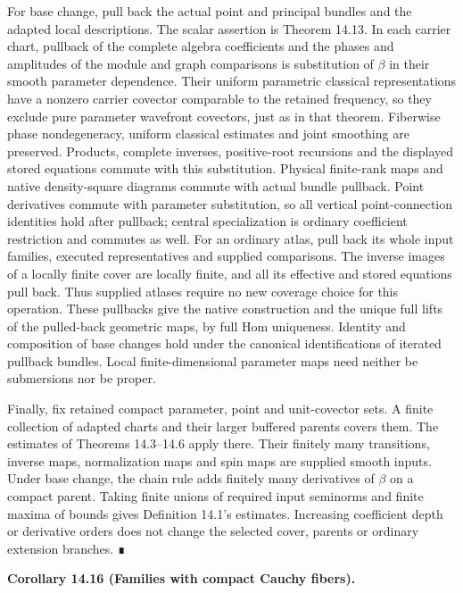 \documentclass[
  english,
  11pt,
  reqno]{amsart}
\makeatletter
\newcommand{\pandocstatementheading}[1]{%
  \par\if@nobreak\else
    \addpenalty{\@beginparpenalty}%
    \addvspace{.5\baselineskip plus .2\baselineskip minus .2\baselineskip}%
  \fi
  {\normalfont\bfseries #1\par}%
  \nobreak\@afterindenttrue\@afterheading
}
\makeatother
\begin{document}
For base change, pull back the actual point and principal bundles and
the adapted local descriptions. The scalar assertion is Theorem 14.13.
In each carrier chart, pullback of the complete algebra coefficients and
the phases and amplitudes of the module and graph comparisons is
substitution of \(\beta\) in their smooth parameter dependence. Their
uniform parametric classical representations have a nonzero carrier
covector comparable to the retained frequency, so they exclude pure
parameter wavefront covectors, just as in that theorem. Fiberwise phase
nondegeneracy, uniform classical estimates and joint smoothing are
preserved. Products, complete inverses, positive-root recursions and the
displayed stored equations commute with this substitution. Physical
finite-rank maps and native density-square diagrams commute with actual
bundle pullback. Point derivatives commute with parameter substitution,
so all vertical point-connection identities hold after pullback; central
specialization is ordinary coefficient restriction and commutes as well.
For an ordinary atlas, pull back its whole input families, executed
representatives and supplied comparisons. The inverse images of a
locally finite cover are locally finite, and all its effective and
stored equations pull back. Thus supplied atlases require no new
coverage choice for this operation. These pullbacks give the native
construction and the unique full lifts of the pulled-back geometric
maps, by full Hom uniqueness. Identity and composition of base changes
hold under the canonical identifications of iterated pullback bundles.
Local finite-dimensional parameter maps need neither be submersions nor
be proper.

Finally, fix retained compact parameter, point and unit-covector sets. A
finite collection of adapted charts and their larger buffered parents
covers them. The estimates of Theorems 14.3--14.6 apply there. Their
finitely many transitions, inverse maps, normalization maps and spin
maps are supplied smooth inputs. Under base change, the chain rule adds
finitely many derivatives of \(\beta\) on a compact parent. Taking
finite unions of required input seminorms and finite maxima of bounds
gives Definition 14.1's estimates. Increasing coefficient depth or
derivative orders does not change the selected cover, parents or
ordinary extension branches. ∎

\pandocstatementheading{\protect{}\label{cor:compact-cauchy-bundle-correspondence}Corollary 14.16 (Families with compact Cauchy fibers).}
\end{document}
